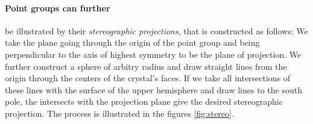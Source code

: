\paragraph{Point groups can further} 
be illustrated by their \emph{stereographic projections}, 
that is constructed as follows: We take the plane going through the origin 
of the point group and being perpendicular to the axis of highest 
symmetry to be the plane of projection. We further construct a sphere 
of arbitry radius and draw straight lines from the origin through the 
centers of the crystal's faces. If we take all intersections of these lines 
with the surface of the upper hemisphere and draw lines to the south pole, 
the intersects with the projection plane give the desired stereographic projection. 
The process is illustrated in the figures \ref{fig:stereo}. 



